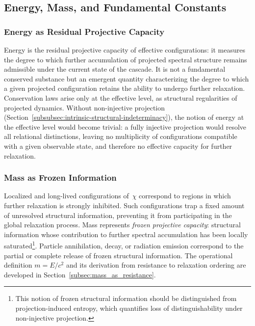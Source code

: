 \subsection{Energy, Mass, and Fundamental Constants}
  \label{subsec:energy-as-capacity-for-relaxation}

  \subsubsection*{Energy as Residual Projective Capacity}

    Energy is the residual projective capacity of effective configurations:
    it measures the degree to which further accumulation of projected spectral
    structure remains admissible under the current state of the cascade.
    It is not a fundamental conserved substance but an emergent quantity
    characterizing the degree to which a given projected configuration retains
    the ability to undergo further relaxation.
    Conservation laws arise only at the effective level, as structural
    regularities of projected dynamics.
    Without non-injective projection
    (Section~\ref{subsubsec:intrinsic-structural-indeterminacy}), the notion of energy at the
    effective level would become trivial: a fully injective projection would resolve all
    relational distinctions, leaving no multiplicity of configurations compatible with a
    given observable state, and therefore no effective capacity for further relaxation.

  \subsubsection*{Mass as Frozen Information}
    \label{subsec:mass-as-frozen-information}

    Localized and long-lived configurations of~$\chi$ correspond to regions in
    which further relaxation is strongly inhibited.
    Such configurations trap a fixed amount of unresolved structural
    information, preventing it from participating in the global relaxation
    process.
    Mass represents \emph{frozen projective capacity}: structural information
    whose contribution to further spectral accumulation has been locally
    saturated\footnote{%
  This notion of frozen structural information should be distinguished from
  projection-induced entropy, which quantifies loss of distinguishability
  under non-injective projection.}.
    Particle annihilation, decay, or radiation emission correspond to the
    partial or complete release of frozen structural information.
    The operational definition $m = E/c^2$ and its derivation from resistance
    to relaxation ordering are developed in
    Section~\ref{subsec:mass_as_resistance}.

